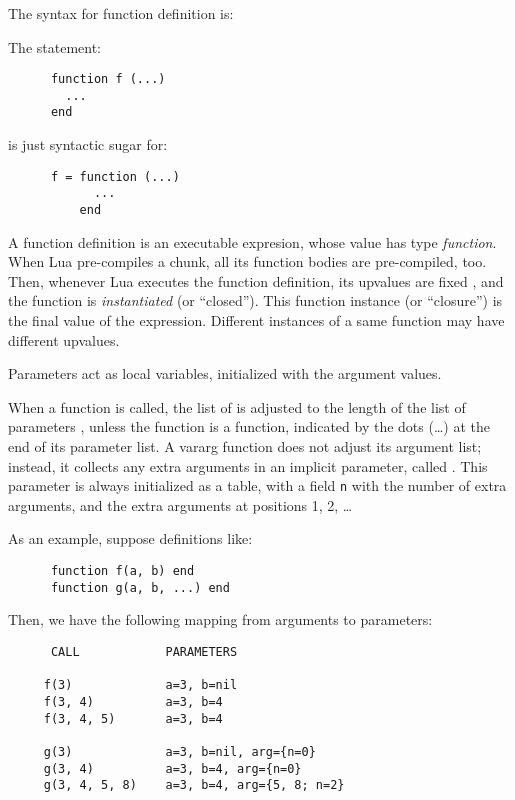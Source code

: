 \subsubsection{} \label{func-def}

The syntax for function definition is:
\begin{Produc}
\end{Produc}
The statement:
\begin{verbatim}
      function f (...)
        ...
      end
\end{verbatim}
is just syntactic sugar for:
\begin{verbatim}
      f = function (...)
            ...
          end
\end{verbatim}

A function definition is an executable expresion,
whose value has type \emph{function}.
When Lua pre-compiles a chunk,
all its function bodies are pre-compiled, too.
Then, whenever Lua executes the function definition,
its upvalues are fixed ,
and the function is \emph{instantiated} (or ``closed'').
This function instance (or ``closure'')
is the final value of the expression.
Different instances of a same function
may have different upvalues.

Parameters act as local variables,
initialized with the argument values.
\begin{Produc}
\end{Produc}
\label{vararg}
When a function is called,
the list of  is adjusted to
the length of the list of parameters ,
unless the function is a  function,
indicated by the dots (\ldots) at the end of its parameter list.
A vararg function does not adjust its argument list;
instead, it collects any extra arguments in an implicit parameter,
called .
This parameter is always initialized as a table,
with a field \verb|n| with the number of extra arguments,
and the extra arguments at positions 1, 2, \ldots

As an example, suppose definitions like:
\begin{verbatim}
      function f(a, b) end
      function g(a, b, ...) end
\end{verbatim}
Then, we have the following mapping from arguments to parameters:
\begin{verbatim}
      CALL            PARAMETERS

     f(3)             a=3, b=nil
     f(3, 4)          a=3, b=4
     f(3, 4, 5)       a=3, b=4

     g(3)             a=3, b=nil, arg={n=0}
     g(3, 4)          a=3, b=4, arg={n=0}
     g(3, 4, 5, 8)    a=3, b=4, arg={5, 8; n=2}
\end{verbatim}

